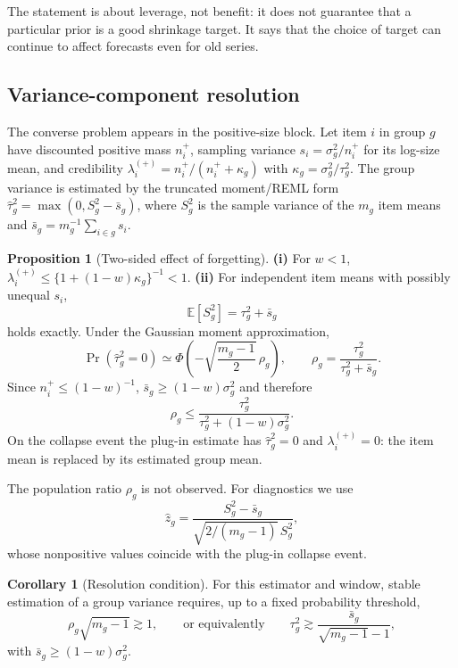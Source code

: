 \documentclass[twocolumn,10pt]{article}
\theoremstyle{definition}
\newtheorem{proposition}{Proposition}
\newtheorem{corollary}{Corollary}
\newcommand{\E}{\mathbb{E}}
\begin{document}
The statement is about leverage, not benefit: it does not guarantee
that a particular prior is a good shrinkage target. It says that the
choice of target can continue to affect forecasts even for old series.

\subsection{Variance-component resolution}\label{sec:resolution}

The converse problem appears in the positive-size block. Let item $i$
in group $g$ have discounted positive mass $n_i^+$, sampling variance
$s_i=\sigma_g^2/n_i^+$ for its log-size mean, and credibility
$\lambda_i^{(+)}=n_i^+/(n_i^++\kappa_g)$ with
$\kappa_g=\sigma_g^2/\tau_g^2$. The group variance is estimated by the
truncated moment/REML form
$\hat\tau_g^2=\max(0,S_g^2-\bar s_g)$, where $S_g^2$ is the sample
variance of the $m_g$ item means and
$\bar s_g=m_g^{-1}\sum_{i\in g}s_i$.

\begin{proposition}[Two-sided effect of forgetting]
\label{prop:twosided}
\textbf{(i)} For $w<1$,
$\lambda_i^{(+)}\le\{1+(1-w)\kappa_g\}^{-1}<1$.
\textbf{(ii)} For independent item means with possibly unequal $s_i$,
\[
\E[S_g^2]=\tau_g^2+\bar s_g
\]
holds exactly. Under the Gaussian moment approximation,
\begin{equation}
\Pr(\hat\tau_g^2=0)\simeq
\Phi\!\left(-\sqrt{\frac{m_g-1}{2}}\,\rho_g\right),
\qquad
\rho_g=\frac{\tau_g^2}{\tau_g^2+\bar s_g}.
\label{eq:collapse-prob}
\end{equation}
Since $n_i^+\le(1-w)^{-1}$,
$\bar s_g\ge(1-w)\sigma_g^2$ and therefore
\[
\rho_g\le
\frac{\tau_g^2}{\tau_g^2+(1-w)\sigma_g^2}.
\]
On the collapse event the plug-in estimate has $\hat\tau_g^2=0$ and
$\lambda_i^{(+)}=0$: the item mean is replaced by its estimated group
mean.
\end{proposition}

The population ratio $\rho_g$ is not observed. For diagnostics we use
\[
\hat z_g=\frac{S_g^2-\bar s_g}
{\sqrt{2/(m_g-1)}\,S_g^2},
\]
whose nonpositive values coincide with the plug-in collapse event.

\begin{corollary}[Resolution condition]
\label{cor:resolution}
For this estimator and window, stable estimation of a group variance
requires, up to a fixed probability threshold,
\[
\rho_g\sqrt{m_g-1}\gtrsim1,
\qquad\text{or equivalently}\qquad
\tau_g^2\gtrsim
\frac{\bar s_g}{\sqrt{m_g-1}-1},
\]
with $\bar s_g\ge(1-w)\sigma_g^2$.
\end{corollary}
\end{document}
